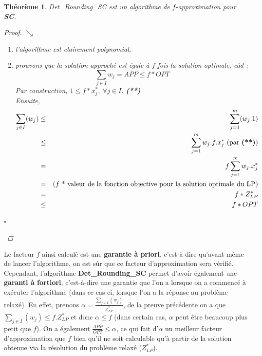 \documentclass{article}
\newcommand{\titre}[1]{\textcolor{title}{#1}}
\newcommand{\cqfd}{\begin{flushright}$\square$\end{flushright}}
\newtheorem{thm}{Th\'eor\`eme}[section]
\newtheorem{proof}{Preuve}[section]
\begin{document}
\begin{sffamily}
\begin{thm} Det\_Rounding\_SC est un algorithme de $f$-\textit{approximation} pour \textbf{\titre{SC}}.
\begin{proof}$\searrow$\\
\begin{enumerate}
\item[a)] l'algorithme est clairement polynomial,
\item[b)] prouvons que la solution approché est égale à $f$ fois la solution optimale, càd :
$$ \sum_{j\in I} w_j = APP \leq f * OPT  $$
Par construction, $1 \leq f*x^*_j,\ \forall j \in I$. \textbf{(**)}\\
Ensuite,
\begin{eqnarray}
\sum_{j\in I} (w_j) & \leq & \sum_{j=1}^m (w_j.1) \\
				    & \leq & \sum_{j=1}^m w_j . f . x^*_j \text{ (par \textbf{(**)})} \\
				    &   =  & f \sum_{j=1}^m w_j . x^*_j \\
					&   =  & \text{($f$  * valeur de la fonction objective pour la solution optimale du LP)} \\
					&   =  & f * Z_{LP}^* \\
					& \leq & f*OPT
\end{eqnarray}
\end{enumerate}
\cqfd
\end{proof}
\end{thm}

Le facteur $f$ ainsi calculé est une \textbf{garantie à priori}, c'est-à-dire qu'avant même de lancer l'algorithme, on est sûr que ce 
facteur d'approximation sera vérifié. Cependant, l'algorithme \textbf{Det\_Rounding\_SC} permet d'avoir également une \textbf{garanti à 
fortiori}, c'est-à-dire une garantie que l'on a lorsque on a commencé à exécuter l'algorithme (dans ce cas-ci, lorsque l'on a la réponse 
au problème relaxé). En effet, prenons $\alpha = \frac{\sum_{j\in I}(w_j)}{Z^*_{LP}}$, de la preuve précédente on a que $\sum_{j\in I}
(w_j) \leq f.Z^*_{LP}$ et donc $\alpha \leq f$ (dans certain cas, $\alpha$ peut être beaucoup plus petit que $f$). On a également 
$\frac{APP}{OPT}\leq \alpha$, ce qui fait d'$\alpha$ un meilleur facteur d'approximation que $f$ bien qu'il ne soit calculable qu'à 
partir de la solution obtenue via la résolution du problème relaxé ($Z^*_{LP}$).

\vspace{4em}


\end{sffamily}
\end{document}
